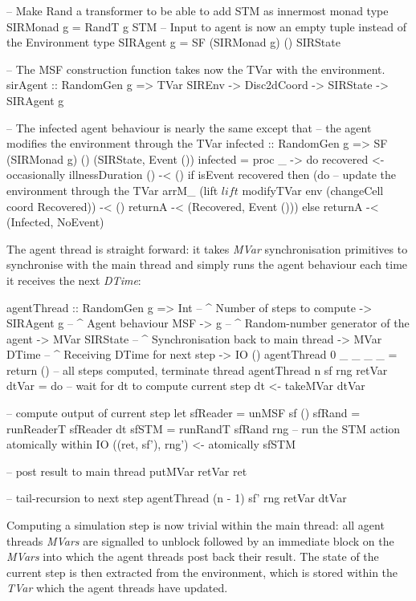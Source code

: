 \begin{HaskellCode}
-- Make Rand a transformer to be able to add STM as innermost monad
type SIRMonad g = RandT g STM
-- Input to agent is now an empty tuple instead of the Environment
type SIRAgent g = SF (SIRMonad g) () SIRState

-- The MSF construction function takes now the TVar with the environment.
sirAgent :: RandomGen g => TVar SIREnv -> Disc2dCoord -> SIRState -> SIRAgent g

-- The infected agent behaviour is nearly the same except that
-- the agent modifies the environment through the TVar
infected :: RandomGen g => SF (SIRMonad g) () (SIRState, Event ())
infected = proc _ -> do
  recovered <- occasionally illnessDuration () -< ()
  if isEvent recovered
    then (do
      -- update the environment through the TVar
      arrM_ (lift $ lift $ modifyTVar env (changeCell coord Recovered)) -< ()
      returnA -< (Recovered, Event ()))
    else returnA -< (Infected, NoEvent)
\end{HaskellCode}

The agent thread is straight forward: it takes \textit{MVar} synchronisation primitives to synchronise with the main thread and simply runs the agent behaviour each time it receives the next \textit{DTime}:

\begin{HaskellCode}
agentThread :: RandomGen g 
            => Int             -- ^ Number of steps to compute
            -> SIRAgent g      -- ^ Agent behaviour MSF
            -> g               -- ^ Random-number generator of the agent
            -> MVar SIRState   -- ^ Synchronisation back to main thread
            -> MVar DTime      -- ^ Receiving DTime for next step
            -> IO ()
agentThread 0 _ _ _ _ = return () -- all steps computed, terminate thread
agentThread n sf rng retVar dtVar = do
  -- wait for dt to compute current step
  dt <- takeMVar dtVar

  -- compute output of current step
  let sfReader = unMSF sf ()
      sfRand   = runReaderT sfReader dt
      sfSTM    = runRandT sfRand rng
  -- run the STM action atomically within IO
  ((ret, sf'), rng') <- atomically sfSTM 

  -- post result to main thread
  putMVar retVar ret
  
  -- tail-recursion to next step 
  agentThread (n - 1) sf' rng retVar dtVar
\end{HaskellCode}

Computing a simulation step is now trivial within the main thread: all agent threads \textit{MVars} are signalled to unblock followed by an immediate block on the \textit{MVars} into which the agent threads post back their result. The state of the current step is then extracted from the environment, which is stored within the \textit{TVar} which the agent threads have updated.

